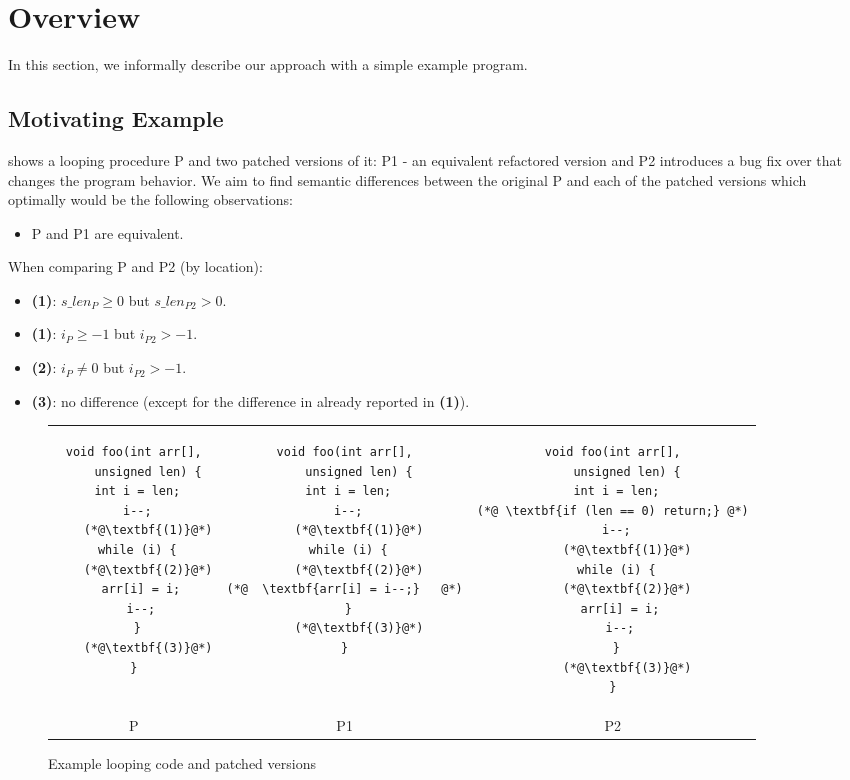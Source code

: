 \section{Overview} 

In this section, we informally describe our approach with a simple example program.

\subsection{Motivating Example}

 shows a looping procedure P and two patched versions of it: P1 - an equivalent refactored version and P2 introduces a bug fix over that changes the program behavior. We aim to find semantic differences between the original P and each of the patched versions which optimally would be the following observations:
\begin{itemize}
\item P and P1 are equivalent.
\end{itemize}
When comparing P and P2 (by location):
\begin{itemize}
\item \textbf{(1)}: $s\_len_{P} \geq 0$ but $s\_len_{P2} > 0$.
\item \textbf{(1)}: $i_{P} \geq -1$ but $i_{P2} > -1$.
\item \textbf{(2)}: $i_{P} \neq 0$ but $i_{P2} > -1$.
\item \textbf{(3)}: no difference (except for the difference in  already reported in \textbf{(1)}).
\end{itemize}

\begin{figure*}
\centering
\begin{tabular}{ccc}
\begin{lstlisting}
void foo(int arr[],
    unsigned len) {
 int i = len;
 i--;
    (*@\textbf{(1)}@*)
 while (i) {
    (*@\textbf{(2)}@*)
  arr[i] = i;
  i--;
 }
    (*@\textbf{(3)}@*)
}
\end{lstlisting}
&
\begin{lstlisting}
void foo(int arr[],
    unsigned len) {
 int i = len;
 i--;
    (*@\textbf{(1)}@*)
 while (i) {
    (*@\textbf{(2)}@*)
(*@  \textbf{arr[i] = i--;}   @*)
 }
    (*@\textbf{(3)}@*)
}
\end{lstlisting}
&
\begin{lstlisting}
void foo(int arr[],
    unsigned len) {
 int i = len;
(*@ \textbf{if (len == 0) return;} @*)
 i--;
    (*@\textbf{(1)}@*)
 while (i) {
    (*@\textbf{(2)}@*)
  arr[i] = i;
  i--;
 }
    (*@\textbf{(3)}@*)
}
\end{lstlisting}
\\
\small{P} & \small{P1} & \small{P2} \\
\end{tabular}
\caption{Example looping code and patched versions}
\end{figure*}

